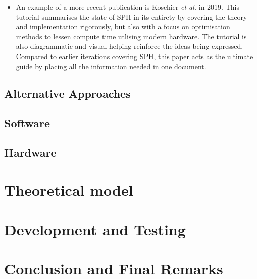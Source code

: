 \documentclass[a4paper,11pt]{article}
\begin{document}
\begin{multicols}{2}
\begin{itemize}
 \item An example of a more recent publication is Koschier \textit{et al.} \cite{koschier} in 2019. This tutorial summarises the state of SPH in its entirety by covering the theory and implementation rigorously, but also with a focus on optimisation methods to lessen compute time utlising modern hardware. The tutorial is also diagrammatic and visual helping reinforce the ideas being expressed. Compared to earlier iterations covering SPH, this paper acts as the ultimate guide by placing all the information needed in one document.%
\end{itemize}
\subsection{Alternative Approaches}
\subsection{Software}
\subsection{Hardware}
\section{Theoretical model}
\section{Development and Testing}
\section{Conclusion and Final Remarks}

\newpage
\nocite{*}


\end{multicols}
\end{document}
